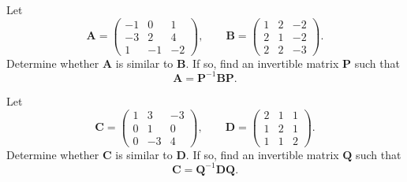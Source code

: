 \documentclass[11pt,oneside]{article}
\begin{document}
\begin{problem}
\begin{problemsubparts}
\item Let
\[
\mathbf A=
\begin{pmatrix}
-1&0&1\\
-3&2&4\\
1&-1&-2
\end{pmatrix},
\qquad
\mathbf B=
\begin{pmatrix}
1&2&-2\\
2&1&-2\\
2&2&-3
\end{pmatrix}.
\]
Determine whether $\mathbf A$ is similar to $\mathbf B$. If so, find an invertible matrix $\mathbf P$ such that
\[
\mathbf A=\mathbf P^{-1}\mathbf B\mathbf P.
\]
\item Let
\[
\mathbf C=
\begin{pmatrix}
1&3&-3\\
0&1&0\\
0&-3&4
\end{pmatrix},
\qquad
\mathbf D=
\begin{pmatrix}
2&1&1\\
1&2&1\\
1&1&2
\end{pmatrix}.
\]
Determine whether $\mathbf C$ is similar to $\mathbf D$. If so, find an invertible matrix $\mathbf Q$ such that
\[
\mathbf C=\mathbf Q^{-1}\mathbf D\mathbf Q.
\]
\end{problemsubparts}
\end{problem}
\end{document}
